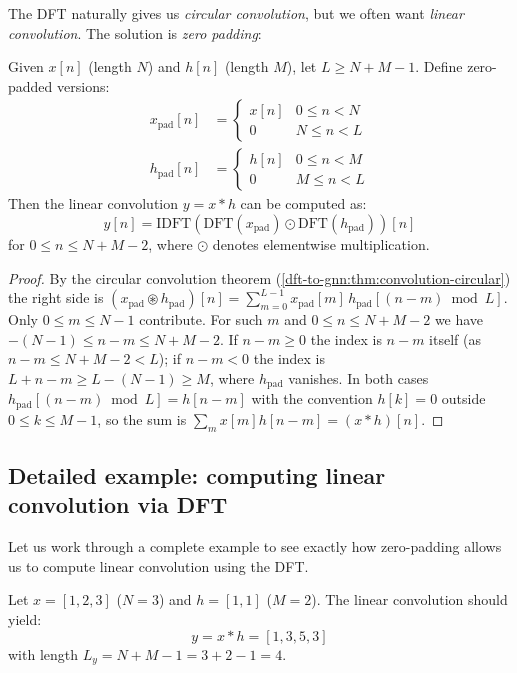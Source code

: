 \begin{notechapter}
The DFT naturally gives us \emph{circular convolution}, but we often
want \emph{linear convolution}. The solution is \emph{zero padding}:

\begin{theorem}
Given $x[n]$ (length $N$) and $h[n]$ (length $M$), let $L \geq N+M-1$.
Define zero-padded versions:
\begin{align*}
x_{\text{pad}}[n] &= \begin{cases}
x[n] & 0 \leq n < N \\
0 & N \leq n < L
\end{cases} \\
h_{\text{pad}}[n] &= \begin{cases}
h[n] & 0 \leq n < M \\
0 & M \leq n < L
\end{cases}
\end{align*}
Then the linear convolution $y = x * h$ can be computed as:
\begin{equation}
y[n] = \text{IDFT}\left(\text{DFT}(x_{\text{pad}}) \odot
       \text{DFT}(h_{\text{pad}})\right)[n]
\end{equation}
for $0 \leq n \leq N+M-2$, where $\odot$ denotes elementwise
multiplication.
\end{theorem}

\begin{proof}
By the circular convolution theorem (\cref{dft-to-gnn:thm:convolution-circular}) the right side is $(x_{\text{pad}}\circledast h_{\text{pad}})[n] = \sum_{m=0}^{L-1} x_{\text{pad}}[m]\,h_{\text{pad}}[(n-m)\bmod L]$. Only $0\le m\le N-1$ contribute. For such $m$ and $0\le n\le N+M-2$ we have $-(N-1) \le n-m \le N+M-2$. If $n - m \ge 0$ the index is $n-m$ itself (as $n-m \le N+M-2 < L$); if $n-m<0$ the index is $L+n-m \ge L-(N-1) \ge M$, where $h_{\text{pad}}$ vanishes. In both cases $h_{\text{pad}}[(n-m)\bmod L] = h[n-m]$ with the convention $h[k] = 0$ outside $0\le k\le M-1$, so the sum is $\sum_m x[m]h[n-m] = (x*h)[n]$.
\end{proof}

\subsection{Detailed example: computing linear convolution via DFT}

Let us work through a complete example to see exactly how zero-padding allows us to compute
linear convolution using the DFT.

\begin{example}
Let $x = [1, 2, 3]$ ($N=3$) and $h = [1, 1]$ ($M=2$). The linear convolution should yield:
\[
y = x * h = [1, 3, 5, 3]
\]
with length $L_y = N + M - 1 = 3 + 2 - 1 = 4$.


\end{example}
\end{notechapter}
